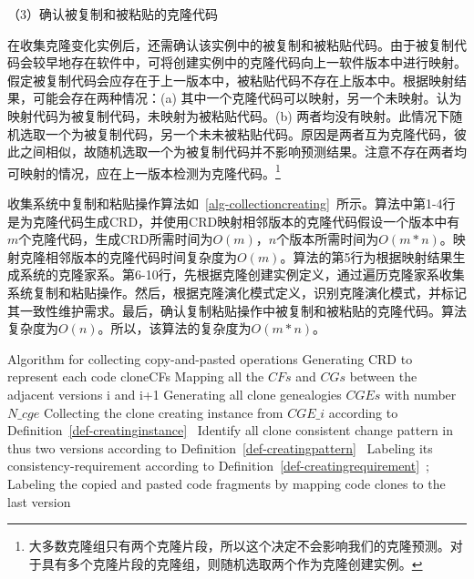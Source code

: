 （3）确认被复制和被粘贴的克隆代码

在收集克隆变化实例后，还需确认该实例中的被复制和被粘贴代码。由于被复制代码会较早地存在软件中，可将创建实例中的克隆代码向上一软件版本中进行映射。假定被复制代码会应存在于上一版本中，被粘贴代码不存在上版本中。根据映射结果，可能会存在两种情况：(a) 其中一个克隆代码可以映射，另一个未映射。认为映射代码为被复制代码，未映射为被粘贴代码。(b) 两者均没有映射。此情况下随机选取一个为被复制代码，另一个未未被粘贴代码。原因是两者互为克隆代码，彼此之间相似，故随机选取一个为被复制代码并不影响预测结果。注意不存在两者均可映射的情况，应在上一版本检测为克隆代码。\footnote{大多数克隆组只有两个克隆片段，所以这个决定不会影响我们的克隆预测。对于具有多个克隆片段的克隆组，则随机选取两个作为克隆创建实例。}

收集系统中复制和粘贴操作算法如~\ref{alg-collectioncreating}~所示。算法中第1-4行是为克隆代码生成CRD，并使用CRD映射相邻版本的克隆代码假设一个版本中有$m$个克隆代码，生成CRD所需时间为$O(m)$，$n$个版本所需时间为$O(m*n)$。映射克隆相邻版本的克隆代码时间复杂度为$O(m)$。算法的第5行为根据映射结果生成系统的克隆家系。第6-10行，先根据克隆创建实例定义，通过遍历克隆家系收集系统复制和粘贴操作。然后，根据克隆演化模式定义，识别克隆演化模式，并标记其一致性维护需求。最后，确认复制粘贴操作中被复制和被粘贴的克隆代码。算法复杂度为$O(n)$。所以，该算法的复杂度为$O(m*n)$。

\begin{minipage}{0.8\textwidth}
\centering
\begin{algorithm}[H]
 {Algorithm for collecting copy-and-pasted operations}
\label{alg-collectioncreating}
{ 
 Generating CRD to represent each code clone{CFs}\;
 Mapping all the $CFs$ and $CGs$ between the adjacent versions {i} and {i+1}\;
}
Generating all clone genealogies $CGEs$ with number $N\_cge$\;
{ 
 Collecting the clone creating instance from $CGE\_i$ according to Definition~\ref{def-creatinginstance}~\; 
 Identify all clone consistent change pattern in thus two versions according to Definition~\ref{def-creatingpattern}~\;
 Labeling its consistency-requirement according to Definition~\ref{def-creatingrequirement}~; 
 Labeling the copied and pasted code fragments by mapping code clones to the last version\;
}
\end{algorithm}
\end{minipage}

